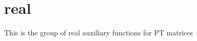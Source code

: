 \hypertarget{group__realPTauxiliary}{}\section{real}
\label{group__realPTauxiliary}
This is the group of real auxiliary functions for P\+T matrices 